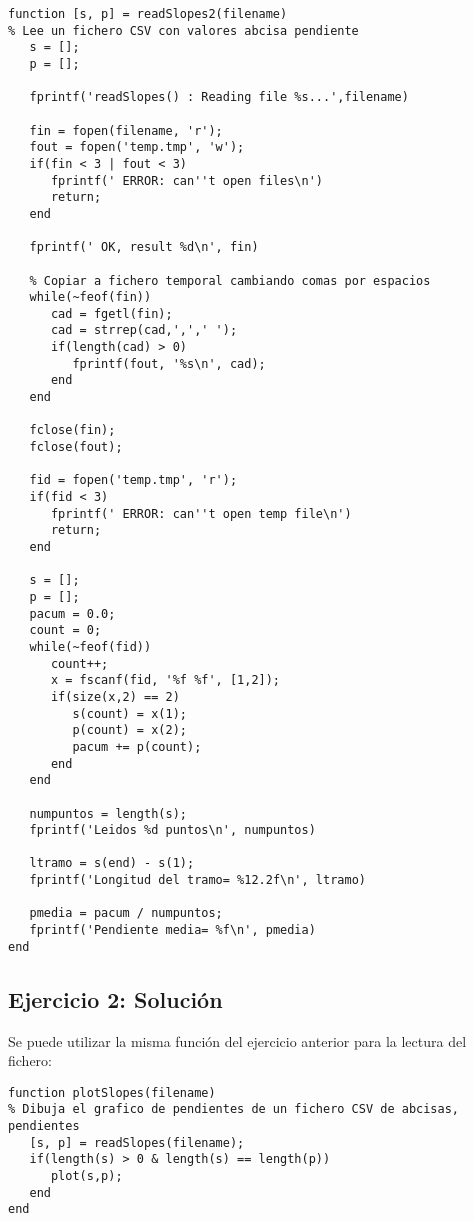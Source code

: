 \documentclass[a4paper,10pt, oneside]{article}
\begin{document}
\begin{lstlisting}[frame=single]
function [s, p] = readSlopes2(filename) 
% Lee un fichero CSV con valores abcisa pendiente
   s = [];
   p = [];

   fprintf('readSlopes() : Reading file %s...',filename)

   fin = fopen(filename, 'r');
   fout = fopen('temp.tmp', 'w');
   if(fin < 3 | fout < 3) 
      fprintf(' ERROR: can''t open files\n')
      return;
   end

   fprintf(' OK, result %d\n', fin)

   % Copiar a fichero temporal cambiando comas por espacios
   while(~feof(fin))
      cad = fgetl(fin);
      cad = strrep(cad,',',' ');
      if(length(cad) > 0)
         fprintf(fout, '%s\n', cad);
      end
   end

   fclose(fin);
   fclose(fout);

   fid = fopen('temp.tmp', 'r');
   if(fid < 3) 
      fprintf(' ERROR: can''t open temp file\n')
      return;
   end

   s = [];
   p = [];
   pacum = 0.0;
   count = 0;
   while(~feof(fid))
      count++;
      x = fscanf(fid, '%f %f', [1,2]);
      if(size(x,2) == 2)
         s(count) = x(1);
         p(count) = x(2);
         pacum += p(count);
      end
   end

   numpuntos = length(s);
   fprintf('Leidos %d puntos\n', numpuntos)

   ltramo = s(end) - s(1);
   fprintf('Longitud del tramo= %12.2f\n', ltramo)
   
   pmedia = pacum / numpuntos;
   fprintf('Pendiente media= %f\n', pmedia)
end
\end{lstlisting}



\subsection{Ejercicio 2: Solución}

Se puede utilizar la misma función del ejercicio anterior para la lectura del fichero:

\begin{lstlisting}[frame=single]
function plotSlopes(filename) 
% Dibuja el grafico de pendientes de un fichero CSV de abcisas, pendientes	
   [s, p] = readSlopes(filename);
   if(length(s) > 0 & length(s) == length(p))
      plot(s,p);
   end
end
\end{lstlisting}
\end{document}
